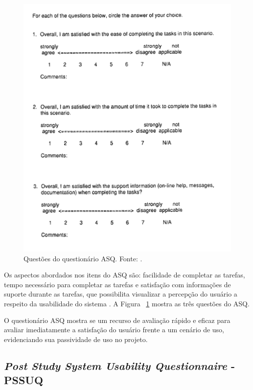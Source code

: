       \begin{figure}[h]
	\centering
	\includegraphics[scale=0.28]{editaveis/figuras/asq_questions}
	\caption[Questões do questionário ASQ]{Questões do questionário ASQ. Fonte: \cite{lewis91}.}
	\label{asq_questions}
      \end{figure}
      
      Os aspectos abordados nos itens do ASQ são: facilidade de completar as tarefas, tempo necessário para completar as tarefas 
      e satisfação com informações de suporte durante as tarefas, que possibilita visualizar a percepção do usuário a respeito da
      usabilidade do sistema \cite{lewis91}. A Figura ~\ref{asq_questions} mostra as três questões do ASQ.
      
      O questionário ASQ mostra se um recurso de avaliação rápido e eficaz para avaliar imediatamente a satisfação do usuário
      frente a um cenário de uso, evidenciando sua passividade de uso no projeto.
    
    \subsection{\textit{Post Study System Usability Questionnaire} - PSSUQ}
      
